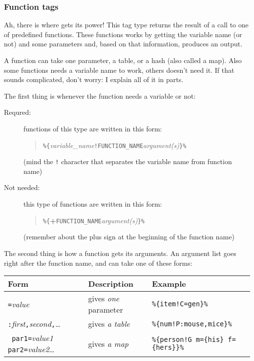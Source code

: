\subsubsection{Function tags}
Ah, there is where \mulan{} gets its power! This tag type returns the result of a call to one of predefined functions.
These functions works by getting the variable name (or not) and some parameters and, based on that information, produces an output. 

A function can take one parameter, a table, or a hash (also called a map). Also some functions needs a variable name to work, others doesn't need it.
If that sounds complicated, don't worry: I explain all of it in parts.

The first thing is whenever the function needs a variable or not:\begin{description}
	\item[Requred:] functions of this type are written in this form: \begin{quote}
		\verb+%{+\textit{variable\_name}\verb+!FUNCTION_NAME+\textit{argument(s)}\verb+}%+
	\end{quote} (mind the \texttt{!} character that separates the variable name from function name)
	\item[Not needed:] this type of functions are written in this form:\begin{quote}
		\verb+%{+\textbf{+}\verb+FUNCTION_NAME+\textit{argument(s)}\verb+}%+
	\end{quote} (remember about the plus sign at the beginning of the function name)
\end{description}

The second thing is how a function gets its arguments. An argument list goes right after the function name, and can take one of these forms:
\begin{center}
	\begin{tabular}{|l|l|l|} \hline 
		\bf Form & \bf Description & \bf Example \\ \hline 
		\verb+=+\textit{value} & gives \emph{one} parameter & \verb+%{item!C=gen}%+ \\ \hline 
		\verb+:+\textit{first}\verb+,+\textit{second}\verb+,+\ldots & gives \emph{a table} & \verb+%{num!P:mouse,mice}%+ \\ \hline 
		\verb*+ par1=+\textit{value1}\verb*+ par2=+\textit{value2}\ldots & gives \emph{a map} & \verb+%{person!G m={his} f={hers}}%+ \\ \hline 
	\end{tabular}
\end{center}

